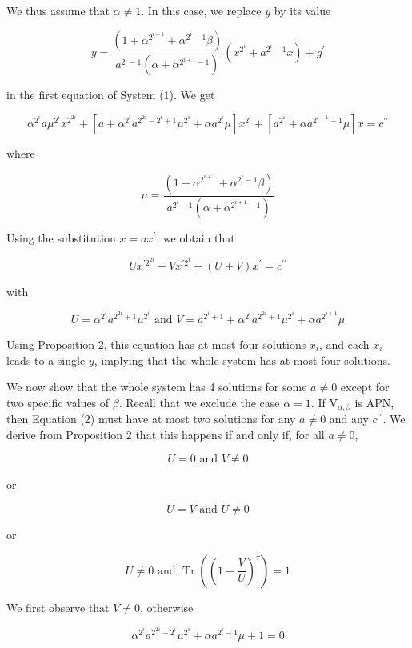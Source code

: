 \documentclass[10pt]{article}
\begin{document}
We thus assume that $\alpha \neq 1$. In this case, we replace $y$ by its value

$$
y=\frac{\left(1+\alpha^{2^{i+1}}+\alpha^{2^{i}-1} \beta\right)}{a^{2^{i}-1}\left(\alpha+\alpha^{2^{i+1}-1}\right)}\left(x^{2^{i}}+a^{2^{i}-1} x\right)+g^{\prime}
$$

in the first equation of System (1). We get

$$
\alpha^{2^{i}} a \mu^{2^{i}} x^{2^{2 i}}+\left[a+\alpha^{2^{i}} a^{2^{2 i}-2^{i}+1} \mu^{2^{i}}+\alpha a^{2^{i}} \mu\right] x^{2^{i}}+\left[a^{2^{i}}+\alpha a^{2^{i+1}-1} \mu\right] x=c^{\prime \prime}
$$

where

$$
\mu=\frac{\left(1+\alpha^{2^{i+1}}+\alpha^{2^{i}-1} \beta\right)}{a^{2^{i}-1}\left(\alpha+\alpha^{2^{i+1}-1}\right)}
$$

Using the substitution $x=a x^{\prime}$, we obtain that


\begin{equation*}
U x^{\prime 2^{2 i}}+V x^{\prime 2^{i}}+(U+V) x^{\prime}=c^{\prime \prime} \tag{2}
\end{equation*}


with

$$
U=\alpha^{2^{i}} a^{2^{2 i}+1} \mu^{2^{i}} \text { and } V=a^{2^{i}+1}+\alpha^{2^{i}} a^{2^{2 i}+1} \mu^{2^{i}}+\alpha a^{2^{i+1}} \mu
$$

Using Proposition 2, this equation has at most four solutions $x_{i}$, and each $x_{i}$ leads to a single $y$, implying that the whole system has at most four solutions.

We now show that the whole system has 4 solutions for some $a \neq 0$ except for two specific values of $\beta$. Recall that we exclude the case $\alpha=1$. If $\mathrm{V}_{\alpha, \beta}$ is APN, then Equation (2) must have at most two solutions for any $a \neq 0$ and any $c^{\prime \prime}$. We derive from Proposition 2 that this happens if and only if, for all $a \neq 0$,

$$
U=0 \text { and } V \neq 0
$$

or

$$
U=V \text { and } U \neq 0
$$

or

$$
U \neq 0 \text { and } \operatorname{Tr}\left(\left(1+\frac{V}{U}\right)^{\tau}\right)=1
$$

We first observe that $V \neq 0$, otherwise

$$
\alpha^{2^{i}} a^{2^{2 i}-2^{i}} \mu^{2^{i}}+\alpha a^{2^{i}-1} \mu+1=0
$$
\end{document}
